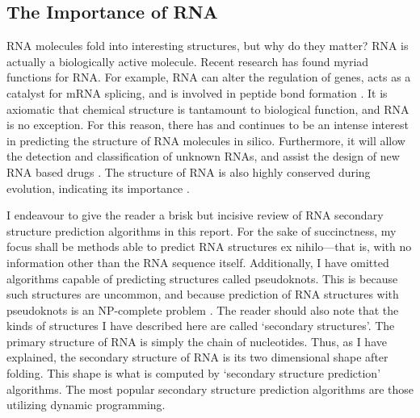 \documentclass[12pt, a4paper]{article}
\begin{document}
\subsection{The Importance of RNA}

RNA molecules fold into interesting structures, but why do they matter? RNA is actually a biologically active molecule. Recent research has found myriad functions for RNA. For example, RNA can alter the regulation of genes, acts as a catalyst for mRNA splicing, and is involved in peptide bond formation
\cite{xu2012statistical}. It is axiomatic that chemical structure is tantamount to biological function, and RNA is no exception. For this reason, there has and continues to be an intense
interest in predicting the structure of RNA
molecules in silico. Furthermore, it will allow the detection and classification of unknown RNAs, and assist the design of new RNA based drugs \cite{condon2003problems}. The structure of RNA
is also highly conserved during evolution, indicating its importance \cite{hofacker2008rna}.

I endeavour to give the reader a brisk but incisive review of RNA secondary structure prediction algorithms in this report. For the sake of succinctness, my focus shall be methods able to predict RNA structures ex nihilo---that is, with no information other than the RNA sequence itself. Additionally, I have omitted algorithms capable of predicting structures called pseudoknots. This is because such structures are uncommon, and because prediction of RNA structures with pseudoknots is an NP-complete problem \cite{lyngso2000rna}. The reader should also note that the kinds of structures I have described here are called `secondary structures'. The primary structure of RNA is simply the chain of nucleotides. Thus, as I have explained, the secondary structure of RNA is its two dimensional shape after folding. This shape is what is computed by `secondary structure prediction' algorithms. The most popular secondary structure prediction algorithms are those utilizing dynamic programming.
\end{document}
